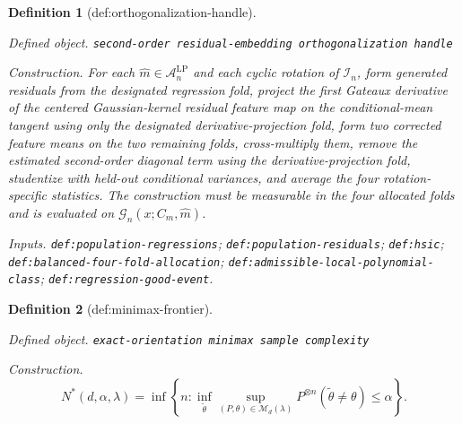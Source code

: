 \documentclass{article}
\newtheorem{definition}{Definition}
\begin{document}
\begin{definition}[def:orthogonalization-handle]\label{def:orthogonalization-handle}
\par\smallskip\noindent\emph{Defined object.} \texttt{second-\allowbreak{}order residual-\allowbreak{}embedding orthogonalization handle}
\par\smallskip\noindent\emph{Construction.} For each \(\widehat m\in\mathcal A_n^{\mathrm{LP}}\) and each cyclic rotation of \(\mathcal I_n\), form generated residuals from the designated regression fold, project the first Gateaux derivative of the centered Gaussian-kernel residual feature map on the conditional-mean tangent using only the designated derivative-projection fold, form two corrected feature means on the two remaining folds, cross-multiply them, remove the estimated second-order diagonal term using the derivative-projection fold, studentize with held-out conditional variances, and average the four rotation-specific statistics. The construction must be measurable in the four allocated folds and is evaluated on \(\mathcal G_n(x;C_m,\widehat m)\).
\par\smallskip\noindent\emph{Inputs.} \texttt{def:\allowbreak{}population-\allowbreak{}regressions}; \texttt{def:\allowbreak{}population-\allowbreak{}residuals}; \texttt{def:\allowbreak{}hsic}; \texttt{def:\allowbreak{}balanced-\allowbreak{}four-\allowbreak{}fold-\allowbreak{}allocation}; \texttt{def:\allowbreak{}admissible-\allowbreak{}local-\allowbreak{}polynomial-\allowbreak{}class}; \texttt{def:\allowbreak{}regression-\allowbreak{}good-\allowbreak{}event}.
\end{definition}

\begin{definition}[def:minimax-frontier]\label{def:minimax-frontier}
\par\smallskip\noindent\emph{Defined object.} \texttt{exact-\allowbreak{}orientation minimax sample complexity}
\par\smallskip\noindent\emph{Construction.} \[N^*(d,\alpha,\lambda)=\inf\left\{n:\inf_{\widetilde\theta}\sup_{(P,\theta)\in\mathcal M_d(\lambda)}P^{\otimes n}(\widetilde\theta\ne\theta)\le\alpha\right\}.\]
\end{definition}
\end{document}
